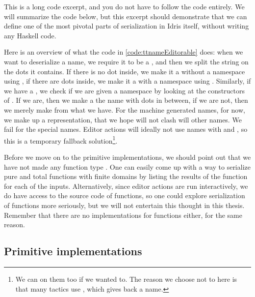 This is a long code excerpt, and you do not have to follow the code entirely.
We will summarize the code below, but this excerpt should demonstrate that
we can define one of the most pivotal parts of serialization in Idris itself,
without writing any Haskell code.

Here is an overview of what the code in \autoref{code:ttnameEditorable} does:
when we want to deserialize a name, we require it to be a , and
then we split the string  on the dots it contains. If there is no dot
inside, we make it a  without a namespace using , if there
are dots inside, we make it a  with a namespace using .
Similarly, if we have a , we check if we are given a namespace by
looking at the constructors of . If we are, then we make a
 the name with dots in between, if we are not, then we merely make
 from what we have.
For the machine generated names, for now, we make up a representation, that we
hope will not clash will other names.
We fail for the special names. Editor actions will ideally not use names with
 and , so this is a temporary fallback solution\footnote{We can
 on them too if we wanted to. The reason we choose not to here is that
many tactics use , which gives back a  name.}.

Before we move on to the primitive  implementations,
we should point out that we have not made any function type .
One can easily come up with a way to serialize pure and total functions with
finite domains by listing the results of the function for each of the inputs.
Alternatively, since editor actions are run interactively, we do have access to
the source code of functions, so one could explore serialization of functions
more seriously, but we will not entertain this thought in this thesis.
Remember that there are no  implementations for functions either, for
the same reason.

\subsection{Primitive  implementations}\label{ssec:primitiveEditorableDesign}

